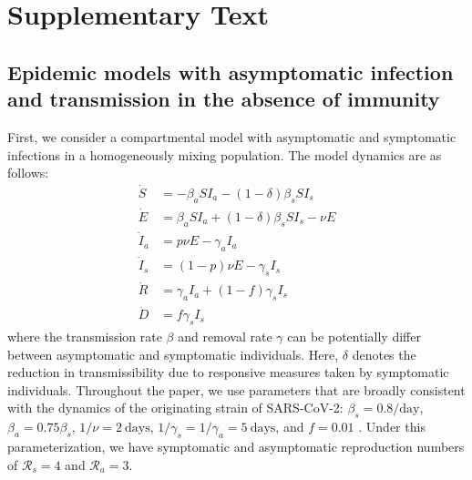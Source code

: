\documentclass[12pt]{article}
\newcommand{\RR}{\ensuremath{{\mathcal R}}\xspace}
\begin{document}
\pagebreak

\section*{Supplementary Text}
\setcounter{figure}{0}
\renewcommand{\thefigure}{S\arabic{figure}}
\renewcommand{\thetable}{S\arabic{table}}

\subsection*{Epidemic models with asymptomatic infection and transmission in the absence of immunity}

First, we consider a compartmental model with asymptomatic and symptomatic infections in a homogeneously mixing population.
The model dynamics are as follows:
\begin{align}
\dot{S} &= -\beta_a S I_a -(1-\delta) \beta_s S I_s \\
\dot{E} &= \beta_a S I_a + (1-\delta) \beta_s S I_s - \nu E\\
\dot{I}_a &= p \nu E - \gamma_a I_a\\
\dot{I}_s &= (1-p) \nu E -\gamma_s I_s\\
\dot{R} &= \gamma_a I_a + (1-f) \gamma_s I_s \\
\dot{D} &= f \gamma_s I_s
\end{align}
where the transmission rate $\beta$ and removal rate $\gamma$ can be potentially differ between asymptomatic and symptomatic individuals.  
Here, $\delta$ denotes the reduction in transmissibility due to responsive measures taken by symptomatic individuals.
Throughout the paper, we use parameters that are broadly consistent with the dynamics of the originating strain of SARS-CoV-2: $\beta_s = 0.8/\mathrm{day}$, $\beta_a = 0.75 \beta_s$, $1/\nu=2\ \mathrm{days}$, $1/\gamma_s=1/\gamma_a=5\ \mathrm{days}$, and $f=0.01$ \citep{park2020reconciling}.
Under this parameterization, we have symptomatic and asymptomatic reproduction numbers of $\RR_s = 4$ and $\RR_a = 3$.
\end{document}
